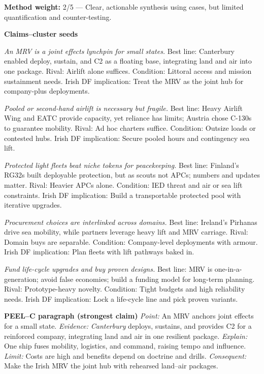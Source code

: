\textbf{Method weight:} 2/5 — Clear, actionable synthesis using cases, but limited quantification and counter-testing.

\textbf{Claims–cluster seeds}

\textit{An MRV is a joint effects lynchpin for small states.} Best line: Canterbury enabled deploy, sustain, and C2 as a floating base, integrating land and air into one package. Rival: Airlift alone suffices. Condition: Littoral access and mission sustainment needs. Irish DF implication: Treat the MRV as the joint hub for company-plus deployments.

\textit{Pooled or second-hand airlift is necessary but fragile.} Best line: Heavy Airlift Wing and EATC provide capacity, yet reliance has limits; Austria chose C-130s to guarantee mobility. Rival: Ad hoc charters suffice. Condition: Outsize loads or contested hubs. Irish DF implication: Secure pooled hours and contingency sea lift.

\textit{Protected light fleets beat niche tokens for peacekeeping.} Best line: Finland’s RG32s built deployable protection, but as scouts not APCs; numbers and updates matter. Rival: Heavier APCs alone. Condition: IED threat and air or sea lift constraints. Irish DF implication: Build a transportable protected pool with iterative upgrades.

\textit{Procurement choices are interlinked across domains.} Best line: Ireland’s Pirhanas drive sea mobility, while partners leverage heavy lift and MRV carriage. Rival: Domain buys are separable. Condition: Company-level deployments with armour. Irish DF implication: Plan fleets with lift pathways baked in.

\textit{Fund life-cycle upgrades and buy proven designs.} Best line: MRV is one-in-a-generation; avoid false economies; build a funding model for long-term planning. Rival: Prototype-heavy novelty. Condition: Tight budgets and high reliability needs. Irish DF implication: Lock a life-cycle line and pick proven variants.

\textbf{PEEL–C paragraph (strongest claim)}
\textit{Point:} An MRV anchors joint effects for a small state.
\textit{Evidence:} \textit{Canterbury} deploys, sustains, and provides C2 for a reinforced company, integrating land and air in one resilient package.
\textit{Explain:} One ship fuses mobility, logistics, and command, raising tempo and influence.
\textit{Limit:} Costs are high and benefits depend on doctrine and drills.
\textit{Consequent:} Make the Irish MRV the joint hub with rehearsed land–air packages.

